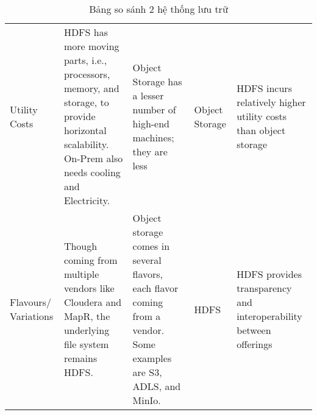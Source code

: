 \begin{longtable}{lllll}
Utility Costs &
  HDFS has more moving parts, i.e., processors, memory, and   storage, to provide horizontal scalability. On-Prem also needs cooling and   Electricity. &
  Object Storage has a lesser number of high-end machines;   they are less &
  Object Storage &
  HDFS incurs relatively higher utility costs than object   storage \\
Flavours/ Variations &
  Though coming from multiple vendors like Cloudera and   MapR, the underlying file system remains HDFS. &
  Object storage comes in several flavors, each flavor   coming from a vendor. Some examples are S3, ADLS, and MinIo. &
  HDFS &
  HDFS provides transparency and interoperability between   offerings
\caption{Bảng so sánh 2 hệ thống lưu trữ}
\label{tab:hdfs-minIO}\\
\end{longtable}